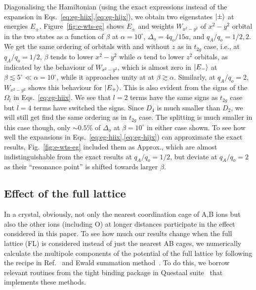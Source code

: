 \documentclass[a4paper,prb,twocolumn]{revtex4-1}  %
\begin{document}
Diagonalising the Hamiltonian 
(using the exact expressions instead 
of the expansion in Eqs.~\ref{eq:eg-hiix},\ref{eq:eg-hijx}),
we obtain two eigenstates $\ket{\pm}$
at energies $E_{\pm}$.
Figure~\ref{fig:e-wts-eg}
shows $E_{\pm}$ and weights $W_{x^2-y^2}$ of $x^2-y^2$ orbital
in the two states
as a function of $\beta$
at $\alpha=10^\circ$, $\Delta_o=4q_o/15a$,
and 
$q_A/q_o=1/2,2$.
We get the same ordering of orbitals with and without $z$ as in $t_{2g}$ case,
i.e.,
at $q_A/q_o=1/2$,
$\beta$ tends to lower
$x^2-y^2$ while $\alpha$ tend to lower $z^2$ orbitals,
as indicated by the behaviour of $W_{x^2-y^2}$,
which is almost zero in $\ket{E_{-}}$ at $\beta\lesssim 5^\circ \ll \alpha=10^\circ$,
while it approaches unity at 
at $\beta\gtrsim \alpha$.
Similarly, at $q_A/q_o=2$,
$W_{x^2-y^2}$ shows this behaviour for $\ket{E_{+}}$.
This is also evident from the signs of the $\Omega_l$
in Eqs.~\ref{eq:eg-hiix}.
We see that $l=2$ terms have the same signs as $t_{2g}$ case but 
$l=4$ terms have switched the signs. 
Since $D_4$ is much smaller than $D_2$,
we will still get find the same ordering as in $t_{2g}$ case.
The splitting is much smaller in this case though, only $\sim 0.5\%$ of $\Delta_o$
at $\beta=10^\circ$ in either case shown.
To see how well
the expansions in Eqs.~\ref{eq:eg-hiix},\ref{eq:eg-hijx})
can approximate the exact results,
Fig.~\ref{fig:e-wts-eg} included
them as Approx., which are almost indistinguishable from the exact results
at $q_A/q_o=1/2$, but deviate at $q_A/q_o=2$ as their
``resonance point'' is shifted towards larger $\beta$.



\subsection{Effect of the full lattice}
\label{sec:FL}

In a crystal, obviously, not only the nearest coordination cage of A,B ions but also
 the other ions (including O) at longer distances
  participate in the effect considered in this paper.
To see how much our results change when 
 the full lattice (FL) is considered instead of just the nearest AB cages,
we numerically calculate the multipole components of the potential
 of the full lattice by following the recipe in Ref.~\cite{FinnisPRL98,PaxtonPRB08,PaxtonNotes}
and Ewald summation method~\cite{Ewald1921}.
To do this, 
we borrow relevant routines from the tight binding package in Questaal suite~\cite{Questaal} that implements these methods.
\end{document}
